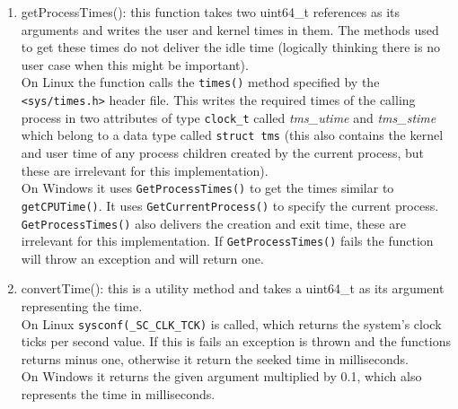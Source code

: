 \begin{enumerate}
\begin{enumerate}
	\end{enumerate}
	\item getProcessTimes(): this function takes two uint64\_t references as its arguments and writes the user and kernel times in them. The methods used to get these times do not deliver the idle time (logically thinking there is no user case when this might be important).\\
	On Linux the function calls the \texttt{times()} method specified by the \texttt{<sys/times.h>} header file. This writes the required times of the calling process in two attributes of type \texttt{clock\_t} called \textit{tms\_utime} and \textit{tms\_stime} which belong to a  data type called \texttt{struct tms} (this also contains the kernel and user time of any process children created by the current process, but these are irrelevant for this implementation).\\
	On Windows it uses \texttt{GetProcessTimes()} to get the times similar to \texttt{getCPUTime()}. It uses \texttt{GetCurrentProcess()} to specify the current process. \texttt{GetProcessTimes()} also delivers the creation and exit time, these are irrelevant for this implementation. If \texttt{GetProcessTimes()} fails the function will throw an exception and will return one.
	\item convertTime(): this is a utility method and takes a uint64\_t as its argument representing the time. \\
	On Linux \texttt{sysconf(\_SC\_CLK\_TCK)} is called, which returns the system's clock ticks per second value. If this is fails an exception is thrown and the functions returns minus one, otherwise it return the seeked time in milliseconds.\\
	On Windows it returns the given argument multiplied by 0.1, which also represents the time in milliseconds. 
\end{enumerate}